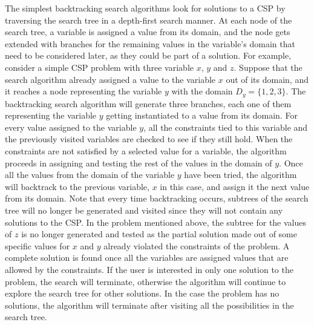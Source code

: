 \documentclass{l4proj}
\begin{document}
\noindent The simplest backtracking search algorithms look for solutions to a CSP by traversing the search tree in a depth-first search manner. At each node of the search tree, a variable is assigned a value from its domain, and the node gets extended with branches for the remaining values in the variable's domain that need to be considered later, as they could be part of a solution. For example, consider a simple CSP problem with three variable $x$, $y$ and $z$. Suppose that the search algorithm already assigned a value to the variable $x$ out of its domain, and it reaches a node representing the variable $y$ with the domain $D_y = \{1, 2, 3\}$. The backtracking search algorithm will generate three branches, each one of them representing the variable $y$ getting instantiated to a value from its domain. For every value assigned to the variable $y$, all the constraints tied to this variable and the previously visited variables are checked to see if they still hold. When the constraints are not satisfied by a selected value for a variable, the algorithm proceeds in assigning and testing the rest of the values in the domain of $y$. Once all the values from the domain of the variable $y$ have been tried, the algorithm will backtrack to the previous variable, $x$ in this case, and assign it the next value from its domain. Note that every time backtracking occurs, subtrees of the search tree will no longer be generated and visited since they will not contain any solutions to the CSP. In the problem mentioned above, the subtree for the values of $z$ is no longer generated and tested as the partial solution made out of some specific values for $x$ and $y$ already violated the constraints of the problem. A complete solution is found once all the variables are assigned values that are allowed by the constraints. If the user is interested in only one solution to the problem, the search will terminate, otherwise the algorithm will continue to explore the search tree for other solutions. In the case the problem has no solutions, the algorithm will terminate after visiting all the possibilities in the search tree.
\end{document}
